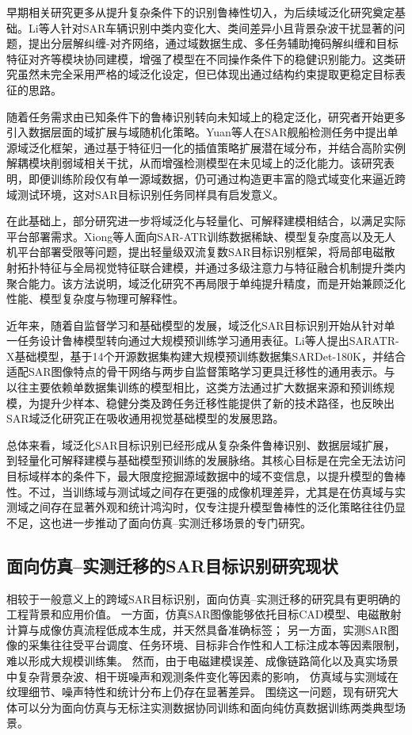早期相关研究更多从提升复杂条件下的识别鲁棒性切入，为后续域泛化研究奠定基础。Li等人\cite{li2023hierarchical}针对SAR车辆识别中类内变化大、类间差异小且背景杂波干扰显著的问题，提出分层解纠缠-对齐网络，通过域数据生成、多任务辅助掩码解纠缠和目标特征对齐等模块协同建模，增强了模型在不同操作条件下的稳健识别能力。这类研究虽然未完全采用严格的域泛化设定，但已体现出通过结构约束提取更稳定目标表征的思路。

随着任务需求由已知条件下的鲁棒识别转向未知域上的稳定泛化，研究者开始更多引入数据层面的域扩展与域随机化策略。Yuan等人\cite{yuan2024filling}在SAR舰船检测任务中提出单源域泛化框架，通过基于特征归一化的插值策略扩展潜在域分布，并结合高阶实例解耦模块削弱域相关干扰，从而增强检测模型在未见域上的泛化能力。该研究表明，即便训练阶段仅有单一源域数据，仍可通过构造更丰富的隐式域变化来逼近跨域测试环境，这对SAR目标识别任务同样具有启发意义。

在此基础上，部分研究进一步将域泛化与轻量化、可解释建模相结合，以满足实际平台部署需求。Xiong等人\cite{xiong2024lightweight}面向SAR-ATR训练数据稀缺、模型复杂度高以及无人机平台部署受限等问题，提出轻量级双流复数SAR目标识别框架，将局部电磁散射拓扑特征与全局视觉特征联合建模，并通过多级注意力与特征融合机制提升类内聚合能力。该方法说明，域泛化研究不再局限于单纯提升精度，而是开始兼顾泛化性能、模型复杂度与物理可解释性。

近年来，随着自监督学习和基础模型的发展，域泛化SAR目标识别开始从针对单一任务设计鲁棒模型转向通过大规模预训练学习通用表征。Li等人\cite{li2025saratr}提出SARATR-X基础模型，基于14个开源数据集构建大规模预训练数据集SARDet-180K，并结合适配SAR图像特点的骨干网络与两步自监督策略学习更具迁移性的通用表示。与以往主要依赖单数据集训练的模型相比，这类方法通过扩大数据来源和预训练规模，为提升少样本、稳健分类及跨任务迁移性能提供了新的技术路径，也反映出SAR域泛化研究正在吸收通用视觉基础模型的发展思路。

总体来看，域泛化SAR目标识别已经形成从复杂条件鲁棒识别、数据层域扩展，到轻量化可解释建模与基础模型预训练的发展脉络。其核心目标是在完全无法访问目标域样本的条件下，最大限度挖掘源域数据中的域不变信息，以提升模型的鲁棒性。不过，当训练域与测试域之间存在更强的成像机理差异，尤其是在仿真域与实测域之间存在显著外观和统计鸿沟时，仅专注提升模型鲁棒性的泛化策略往往仍显不足，这也进一步推动了面向仿真--实测迁移场景的专门研究。


\subsection{面向仿真--实测迁移的SAR目标识别研究现状}
相较于一般意义上的跨域SAR目标识别，面向仿真--实测迁移的研究具有更明确的工程背景和应用价值。
一方面，仿真SAR图像能够依托目标CAD模型、电磁散射计算与成像仿真流程低成本生成，并天然具备准确标签；
另一方面，实测SAR图像的采集往往受平台调度、任务环境、目标非合作性和人工标注成本等因素限制，难以形成大规模训练集\cite{yang2024transfer,lewis2019sar}。
然而，由于电磁建模误差、成像链路简化以及真实场景中复杂背景杂波、相干斑噪声和观测条件变化等因素的影响，
仿真域与实测域在纹理细节、噪声特性和统计分布上仍存在显著差异\cite{lewis2019sar,inkawhich2021bridging}。
围绕这一问题，现有研究大体可以分为面向仿真与无标注实测数据协同训练和面向纯仿真数据训练两类典型场景。

